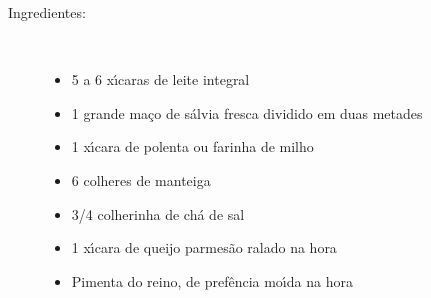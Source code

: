 \documentclass[11pt,letterpaper]{article}
\begin{document}
\begin{description}

\item[Ingredientes:]\ \\
	\begin{itemize}
	\item 5 a 6 x\'{\i}caras de leite integral
	\item 1 grande ma\c{c}o de s\'alvia fresca dividido em duas metades
	\item 1 x\'{\i}cara de polenta ou farinha de milho
	\item 6 colheres de manteiga
	\item 3/4 colherinha de ch\'a de sal
	\item 1 x\'{\i}cara de queijo parmes\~ao ralado na hora 
	\item Pimenta do reino, de pref\^encia mo\'{\i}da na hora
	\end{itemize}


\end{description}
\end{document}
